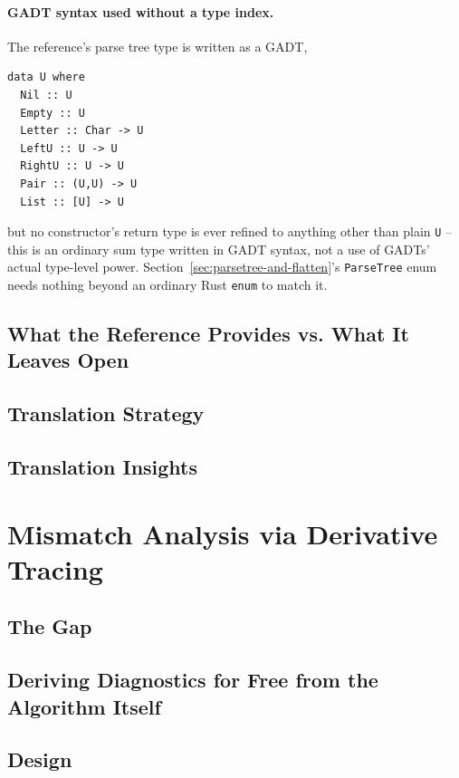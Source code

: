 \paragraph{GADT syntax used without a type index.} The reference's parse
tree type is written as a GADT,
\begin{verbatim}
data U where
  Nil :: U
  Empty :: U
  Letter :: Char -> U
  LeftU :: U -> U
  RightU :: U -> U
  Pair :: (U,U) -> U
  List :: [U] -> U
\end{verbatim}
but no constructor's return type is ever refined to anything other than
plain \texttt{U} -- this is an ordinary sum type written in GADT syntax,
not a use of GADTs' actual type-level power. Section~\ref{sec:parsetree-and-flatten}'s
\texttt{ParseTree} enum needs nothing beyond an ordinary Rust
\texttt{enum} to match it.


\subsection{What the Reference Provides vs. What It Leaves Open}
\label{sec:reference-scope}

\subsection{Translation Strategy}
\label{sec:translation-strategy}

\subsection{Translation Insights}
\label{sec:translation-insights}

\section{Mismatch Analysis via Derivative Tracing}
\label{sec:mismatch-analysis}

\subsection{The Gap}
\label{sec:diagnostics-gap}


\subsection{Deriving Diagnostics for Free from the Algorithm Itself}
\label{sec:diagnostics-for-free}

\subsection{Design}
\label{sec:diagnostics-design}

